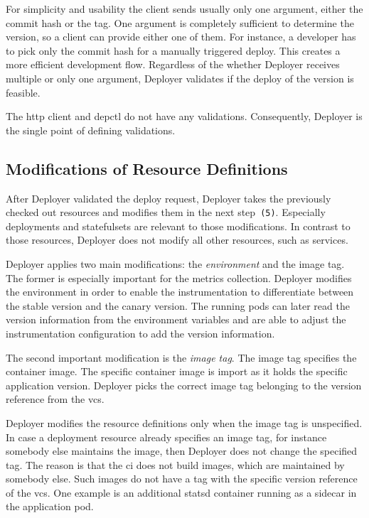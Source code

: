 For simplicity and usability the client sends usually only one argument, either the commit
hash or the tag. One argument is completely sufficient to determine the version, so a
client can provide either one of them. For instance, a developer has to pick only the
commit hash for a manually triggered deploy. This creates a more efficient development
flow. Regardless of the whether Deployer receives multiple or only one argument, Deployer
validates if the deploy of the version is feasible.

The http client and depctl do not have any validations. Consequently, Deployer is the
single point of defining validations.

\subsection{Modifications of Resource Definitions}

After Deployer validated the deploy request, Deployer takes the previously checked out
resources and modifies them in the next step~\texttt{(5)}. Especially deployments and
statefulsets are relevant to those modifications. In contrast to those resources, Deployer
does not modify all other resources, such as services.

Deployer applies two main modifications: the \emph{environment} and the image tag. The
former is especially important for the metrics collection. Deployer modifies the
environment in order to enable the instrumentation to differentiate between the stable
version and the canary version. The running pods can later read the version information
from the environment variables and are able to adjust the instrumentation configuration to
add the version information.

The second important modification is the \emph{image tag}. The image tag specifies the
container image. The specific container image is import as it holds the specific
application version. Deployer picks the correct image tag belonging to the version
reference from the \gls{vcs}.

Deployer modifies the resource definitions only when the image tag is unspecified. In case
a deployment resource already specifies an image tag, for instance somebody else maintains
the image, then Deployer does not change the specified tag. The reason is that the
\gls{ci} does not build images, which are maintained by somebody else. Such images do not
have a tag with the specific version reference of the \gls{vcs}. One example is an
additional statsd container running as a sidecar in the application pod.


